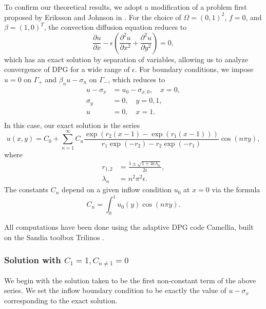 \documentclass[11pt,onecolumn]{scrartcl}
\newcommand{\pd}[2]{\frac{\partial#1}{\partial#2}}
\newcommand{\pdd}[2]{\frac{\partial^2#1}{\partial#2^2}}
\begin{document}
To confirm our theoretical results, we adopt a modification of a problem first proposed by Eriksson and Johnson in \cite{Eriksson1993}. For the choice of $\Omega = (0,1)^2$, $f=0$, and $\beta = (1,0)^T$, the convection diffusion equation reduces to
\[
\pd{u}{x} - \epsilon \left(\pdd{u}{x}+ \pdd{u}{y}\right) = 0,
\]
which has an exact solution by separation of variables, allowing us to analyze convergence of DPG for a wide range of $\epsilon$.  For boundary conditions, we impose $u=0$ on $\Gamma_+$ and $\beta_n u - \sigma_n$ on $\Gamma_-$, which reduces to
\begin{align*}
u-\sigma_x &= u_0-\sigma_{x,0}, \quad x=0,\\
\sigma_y &=  0, \quad y=0,1,\\
u &= 0, \quad x=1.\\
\end{align*}
In this case, our exact solution is the series
\[
u(x,y) = C_0 + \sum_{n=1}^\infty C_n \frac{\exp(r_2(x-1)-\exp(r_1(x-1)))}{r_1\exp(-r_2) - r_2\exp(-r_1)}\cos(n\pi y),
\]
where
\begin{align*}
r_{1,2} &= \frac{1 \pm \sqrt{1 + 4 \epsilon\lambda_n}}{2 \epsilon},\\
\lambda_n &= n^2\pi^2 \epsilon.
\end{align*}
The constants $C_n$ depend on a given inflow condition $u_0$ at $x=0$ via the formula
\[
C_n = \int_0^1 u_0(y) \cos(n\pi y).
\]

All computations have been done using the adaptive DPG code Camellia, built on the Sandia toolbox Trilinos \cite{Camellia}.

\subsubsection{Solution with $C_1 = 1, C_{n\neq 1} = 0$}

We begin with the solution taken to be the first non-constant term of the above series.  We set the inflow boundary condition to be exactly the value of $u-\sigma_x$ corresponding to the exact solution.  
\end{document}
